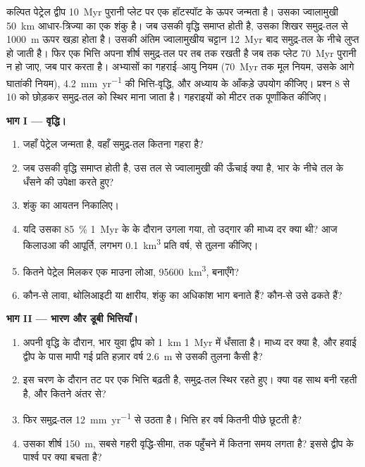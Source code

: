 \begin{problem}[{सप्ताहांत समस्या --- ज्वालामुखी से एटॉल तक}]\label{pb:b2:oceanic-islands:1}
कल्पित पेट्रेल द्वीप \qty{10}{Myr} पुरानी प्लेट पर एक हॉटस्पॉट के ऊपर जन्मता है। उसका ज्वालामुखी
\qty{50}{km} आधार-त्रिज्या का एक शंकु है। जब उसकी वृद्धि समाप्त होती है, उसका शिखर समुद्र-तल से
\qty{1000}{m} ऊपर खड़ा होता है। उसकी अंतिम ज्वालामुखीय चट्टान \qty{12}{Myr} बाद समुद्र-तल के नीचे लुप्त हो जाती है। फिर एक भित्ति
अपना शीर्ष समुद्र-तल पर तब तक रखती है जब तक प्लेट \qty{70}{Myr} पुरानी न हो जाए, जब 
 पार करता है। अभ्यासों का गहराई–आयु नियम (\qty{70}{Myr} तक मूल नियम, उसके आगे
घातांकी नियम), \qty{4.2}{mm.yr^{-1}} की भित्ति-वृद्धि, और अध्याय के आँकड़े उपयोग कीजिए।
प्रश्न 8 से 10 को छोड़कर समुद्र-तल को स्थिर माना जाता है। गहराइयों को मीटर तक पूर्णांकित कीजिए।

\noindent\textbf{भाग I --- वृद्धि।}
\begin{enumerate}
  \item जहाँ पेट्रेल जन्मता है, वहाँ समुद्र-तल कितना गहरा है?
  \item जब उसकी वृद्धि समाप्त होती है, उस तल से ज्वालामुखी की ऊँचाई क्या है, भार के नीचे
        तल के धँसने की उपेक्षा करते हुए?
  \item शंकु का आयतन निकालिए।
  \item यदि उसका \qty{85}{\percent} \qty{1}{Myr} के  के दौरान उगला गया, तो
        उद्गार की माध्य दर क्या थी? आज किलाउआ की आपूर्ति, लगभग
        \qty{0.1}{km^3} प्रति वर्ष, से तुलना कीजिए।
  \item कितने पेट्रेल मिलकर एक माउना लोआ, \qty{95600}{km^3}, बनाएँगे?
  \item कौन-से लावा, थोलिआइटी या क्षारीय, शंकु का अधिकांश भाग बनाते हैं? कौन-से उसे ढकते हैं?
\end{enumerate}

\noindent\textbf{भाग II --- भारण और डूबी भित्तियाँ।}
\begin{enumerate}[resume]
  \item अपनी वृद्धि के दौरान, भार युवा द्वीप को \qty{1}{km} \qty{1}{Myr} में धँसाता है। माध्य
        दर क्या है, और हवाई द्वीप के पास मापी गई प्रति हज़ार वर्ष \qty{2.6}{m} से
        उसकी तुलना कैसी है?
  \item इस चरण के दौरान तट पर एक भित्ति बढ़ती है, समुद्र-तल स्थिर रहते हुए। क्या वह साथ बनी रहती है, और
        कितने अंतर से?
  \item फिर समुद्र-तल \qty{12}{mm.yr^{-1}} से उठता है। भित्ति हर वर्ष कितनी पीछे
        छूटती है?
  \item उसका शीर्ष \qty{150}{m}, सबसे गहरी वृद्धि-सीमा, तक पहुँचने में कितना समय लगता है? इससे
        द्वीप के पार्श्व पर क्या बचता है?
\end{enumerate}


\end{problem}
